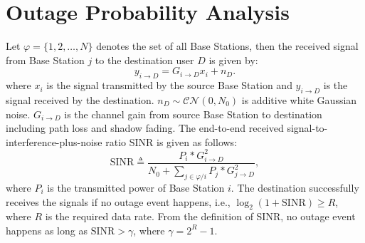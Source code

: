 \section{Outage Probability Analysis}
\label{OutageProb}
\par Let $\varphi = \{1, 2, \dots, N\}$ denotes the set of all Base Stations, then the received signal from Base Station $j$ to the destination user $D$ is given by:
\begin{equation}
y_{i\to D} = G_{i\to D}x_{i}+n_{D}.
\end{equation}
where $x_{i}$ is the signal transmitted by the source Base Station and $y_{i\to D}$ is the signal received by the destination. $n_{D}\sim \mathcal{CN}(0,N_{0})$ is additive white Gaussian noise. $G_{i\to D}$ is the channel gain from source Base Station to destination including path loss and shadow fading. The end-to-end received signal-to-interference-plus-noise ratio $\text{SINR}$ is given as follows:
\begin{equation}
\text{SINR} \triangleq \frac{P_{i}*G_{i\to D}^{2}}{N_{0}+\sum_{j\in \varphi/i}P_{j}*G_{j\to D}^2},
\end{equation}
where $P_{i}$ is the transmitted power of Base Station $i$. The destination successfully receives the signals if no outage event happens, i.e., $\log_{2}(1+\text{SINR})\ge R$, where $R$ is the required data rate. From the definition of SINR, no outage event happens as long as $\text{SINR} > \gamma$, where $\gamma = 2^{R}-1$.


